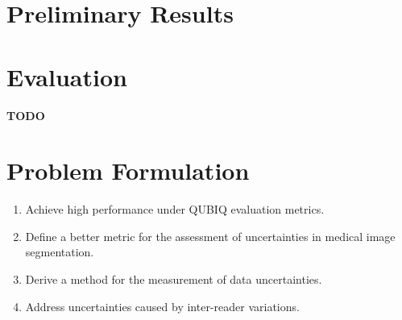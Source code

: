 \documentclass[12pt]{extarticle}
\begin{document}
\section{Preliminary Results}
\section{Evaluation}
\textbf{TODO}

\section{Problem Formulation}
\begin{enumerate}
    \item Achieve high performance under QUBIQ evaluation metrics.
    \item Define a better metric for the assessment of uncertainties in medical image segmentation.
    \item Derive a method for the measurement of data uncertainties.
    \item Address uncertainties caused by inter-reader variations.
\end{enumerate}



\end{document}
